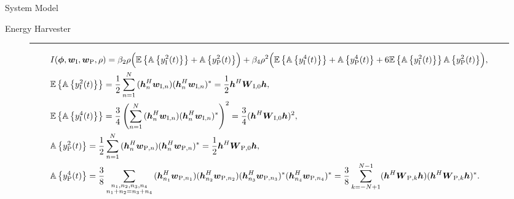\documentclass[journal]{IEEEtran}
\begin{document}
\begin{section}{System Model}
\begin{subsection}{Energy Harvester}
			\begin{figure*}[!b]
				\hrule
				\begin{align}
					&I(\boldsymbol{\phi},\boldsymbol{w}_{\mathrm{I}},\boldsymbol{w}_{\mathrm{P}},\rho) = \beta_2\rho\Bigl(\mathbb{E}\left\{\mathbb{A}\left\{y_{\mathrm{I}}^2(t)\right\}\right\}+\mathbb{A}\left\{y_{\mathrm{P}}^2(t)\right\}\Bigr)+\beta_4\rho^2\Bigl(\mathbb{E}\left\{\mathbb{A}\left\{y_{\mathrm{I}}^4(t)\right\}\right\}+\mathbb{A}\left\{y_{\mathrm{P}}^4(t)\right\}+6\mathbb{E}\left\{\mathbb{A}\left\{y_{\mathrm{I}}^2(t)\right\}\right\}\mathbb{A}\left\{y_{\mathrm{P}}^2(t)\right\}\Bigr),\label{eq:I_expand}\\
					&\mathbb{E}\left\{\mathbb{A}\left\{y_{\mathrm{I}}^2(t)\right\}\right\} = \frac{1}{2}\sum_{n=1}^N{(\boldsymbol{h}_{n}^H\boldsymbol{w}_{\mathrm{I},n})(\boldsymbol{h}_{n}^H\boldsymbol{w}_{\mathrm{I},n})^*} = \frac{1}{2}\boldsymbol{h}^H\boldsymbol{W}_{\mathrm{I},0}\boldsymbol{h},\label{eq:y_I2}\\
					&\mathbb{E}\left\{\mathbb{A}\left\{y_{\mathrm{I}}^4(t)\right\}\right\} = \frac{3}{4}\left(\sum_{n=1}^N{(\boldsymbol{h}_{n}^H\boldsymbol{w}_{\mathrm{I},n})(\boldsymbol{h}_{n}^H\boldsymbol{w}_{\mathrm{I},n})^*}\right)^2 = \frac{3}{4}(\boldsymbol{h}^H\boldsymbol{W}_{\mathrm{I},0}\boldsymbol{h})^2,\label{eq:y_I4}\\
					&\mathbb{A}\left\{y_{\mathrm{P}}^2(t)\right\} = \frac{1}{2}\sum_{n=1}^N{(\boldsymbol{h}_{n}^H\boldsymbol{w}_{\mathrm{P},n})(\boldsymbol{h}_{n}^H\boldsymbol{w}_{\mathrm{P},n})^*} = \frac{1}{2}\boldsymbol{h}^H\boldsymbol{W}_{\mathrm{P},0}\boldsymbol{h},\label{eq:y_P2}\\
					&\mathbb{A}\left\{y_{\mathrm{P}}^4(t)\right\} = \frac{3}{8}\sum_{\substack{{n_1},{n_2},{n_3},{n_4}\\{n_1}+{n_2}={n_3}+{n_4}}}{(\boldsymbol{h}_{{n_1}}^H\boldsymbol{w}_{\mathrm{P},{n_1}})(\boldsymbol{h}_{{n_2}}^H\boldsymbol{w}_{\mathrm{P},{n_2}})(\boldsymbol{h}_{{n_3}}^H\boldsymbol{w}_{\mathrm{P},{n_3}})^*(\boldsymbol{h}_{{n_4}}^H\boldsymbol{w}_{\mathrm{P},{n_4}})^*} = \frac{3}{8}\sum_{k=-N+1}^{N-1}(\boldsymbol{h}^H\boldsymbol{W}_{\mathrm{P},k}\boldsymbol{h})(\boldsymbol{h}^H\boldsymbol{W}_{\mathrm{P},k}\boldsymbol{h})^*.\label{eq:y_P4}
				\end{align}
			\end{figure*}
		\end{subsection}



\end{section}
\end{document}
